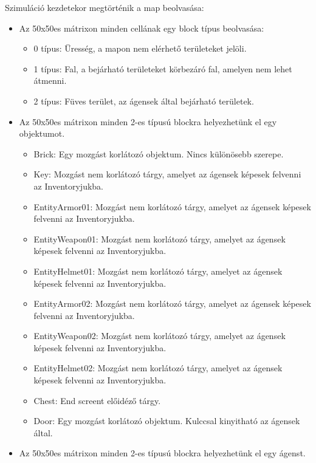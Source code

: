 Szimuláció kezdetekor megtörténik a map beolvasása:

\begin{itemize}
    \item Az 50x50es mátrixon minden cellának egy block típus beolvasása:
    
    \begin{itemize}
        \item 0 típus: Üresség, a mapon nem elérhető területeket jelöli.
        \item 1 típus: Fal, a bejárható területeket körbezáró fal, amelyen nem lehet átmenni.
        \item 2 típus: Füves terület, az ágensek által bejárható területek.
    \end{itemize}

    \item Az 50x50es mátrixon minden 2-es típusú blockra helyezhetünk el egy objektumot.
    
    \begin{itemize}
        \item Brick: Egy mozgást korlátozó objektum. Nincs különösebb szerepe.
        \item Key: Mozgást nem korlátozó tárgy, amelyet az ágensek képesek felvenni az Inventoryjukba.
        \item EntityArmor01: Mozgást nem korlátozó tárgy, amelyet az ágensek képesek felvenni az Inventoryjukba.
        \item EntityWeapon01: Mozgást nem korlátozó tárgy, amelyet az ágensek képesek felvenni az Inventoryjukba.
        \item EntityHelmet01: Mozgást nem korlátozó tárgy, amelyet az ágensek képesek felvenni az Inventoryjukba.
        \item EntityArmor02: Mozgást nem korlátozó tárgy, amelyet az ágensek képesek felvenni az Inventoryjukba.
        \item EntityWeapon02: Mozgást nem korlátozó tárgy, amelyet az ágensek képesek felvenni az Inventoryjukba.
        \item EntityHelmet02: Mozgást nem korlátozó tárgy, amelyet az ágensek képesek felvenni az Inventoryjukba.
        \item Chest: End screent előidéző tárgy.
        \item Door: Egy mozgást korlátozó objektum. Kulccsal kinyitható az ágensek által.
    \end{itemize}

    \item Az 50x50es mátrixon minden 2-es típusú blockra helyezhetünk el egy ágenst.
    

\end{itemize}

